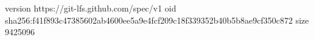version https://git-lfs.github.com/spec/v1
oid sha256:f41f893c47385602ab4600ee5a9e4fcf209c18f339352b40b5b8ae9cf350c872
size 9425096
